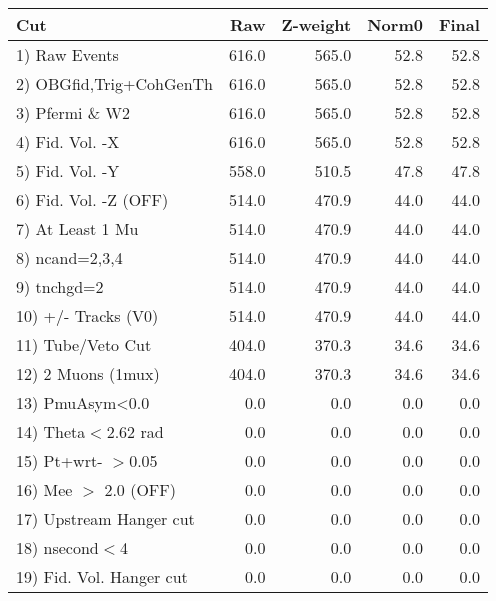  \begin{table}[h!]\centering
 \begin{tabular}{||l||r|r|r|r||}
 \hline
 \hline
 Cut & Raw & Z-weight & Norm0 & Final \\
 \hline
  1) Raw Events           &       616.0 &       565.0 &        52.8 &        52.8 \\
  2) OBGfid,Trig+CohGenTh &       616.0 &       565.0 &        52.8 &        52.8 \\
  3) Pfermi \& W2         &       616.0 &       565.0 &        52.8 &        52.8 \\
  4) Fid. Vol. -X         &       616.0 &       565.0 &        52.8 &        52.8 \\
  5) Fid. Vol. -Y         &       558.0 &       510.5 &        47.8 &        47.8 \\
  6) Fid. Vol. -Z (OFF)   &       514.0 &       470.9 &        44.0 &        44.0 \\
  7) At Least 1 Mu        &       514.0 &       470.9 &        44.0 &        44.0 \\
  8) ncand=2,3,4          &       514.0 &       470.9 &        44.0 &        44.0 \\
  9) tnchgd=2             &       514.0 &       470.9 &        44.0 &        44.0 \\
 10) +/- Tracks (V0)      &       514.0 &       470.9 &        44.0 &        44.0 \\
 11) Tube/Veto Cut        &       404.0 &       370.3 &        34.6 &        34.6 \\
 12) 2 Muons (1mux)       &       404.0 &       370.3 &        34.6 &        34.6 \\
 13) PmuAsym<0.0          &         0.0 &         0.0 &         0.0 &         0.0 \\
 14) Theta$<$2.62 rad     &         0.0 &         0.0 &         0.0 &         0.0 \\
 15) Pt+wrt- $>$0.05      &         0.0 &         0.0 &         0.0 &         0.0 \\
 16) Mee $>$ 2.0  (OFF)   &         0.0 &         0.0 &         0.0 &         0.0 \\
 17) Upstream Hanger cut  &         0.0 &         0.0 &         0.0 &         0.0 \\
 18) nsecond$<$4          &         0.0 &         0.0 &         0.0 &         0.0 \\
 19) Fid. Vol. Hanger cut &         0.0 &         0.0 &         0.0 &         0.0 \\

\end{tabular}
\end{table}

